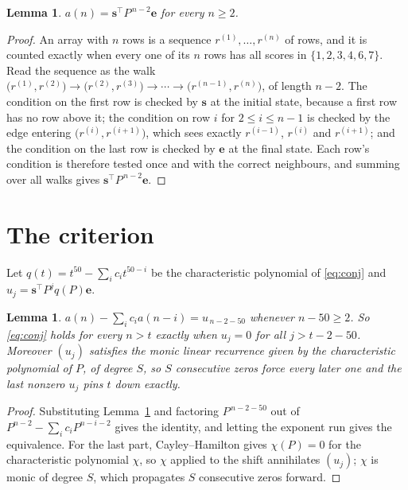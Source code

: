 \documentclass[11pt,a4paper]{article}
\theoremstyle{plain}
\newtheorem{lemma}[theorem]{Lemma}
\theoremstyle{definition}
\begin{document}
\begin{lemma}\label{lem:walk}
$a(n)=\mathbf{s}^{\!\top}P^{\,n-2}\mathbf{e}$ for every $n\ge2$.
\end{lemma}

\begin{proof}
An array with $n$ rows is a sequence $r^{(1)},\dots,r^{(n)}$ of rows, and it is counted
exactly when every one of its $n$ rows has all scores in $\{1,2,3,4,6,7\}$. Read the sequence as the
walk $\bigl(r^{(1)},r^{(2)}\bigr)\to\bigl(r^{(2)},r^{(3)}\bigr)\to\cdots\to
\bigl(r^{(n-1)},r^{(n)}\bigr)$, of length $n-2$. The condition on the first row is
checked by $\mathbf{s}$ at the initial state, because a first row has no row above it; the
condition on row $i$ for $2\le i\le n-1$ is checked by the edge entering
$\bigl(r^{(i)},r^{(i+1)}\bigr)$, which sees exactly $r^{(i-1)}$, $r^{(i)}$ and
$r^{(i+1)}$; and the condition on the last row is checked by $\mathbf{e}$ at the final
state. Each row's condition is therefore tested once and with the correct neighbours, and
summing over all walks gives $\mathbf{s}^{\!\top}P^{\,n-2}\mathbf{e}$.
\end{proof}

\section{The criterion}

Let $q(t)=t^{50}-\sum_i c_i t^{50-i}$ be the characteristic polynomial of
\eqref{eq:conj} and $u_j=\mathbf{s}^{\!\top}P^{j}q(P)\mathbf{e}$.

\begin{lemma}\label{lem:crit}
$a(n)-\sum_i c_i a(n-i)=u_{\,n-2-50}$ whenever $n-50\ge2$. So \eqref{eq:conj}
holds for every $n>t$ exactly when $u_j=0$ for all $j>t-2-50$. Moreover $(u_j)$
satisfies the monic linear recurrence given by the characteristic polynomial of $P$, of
degree $S$, so $S$ consecutive zeros force every later one and the last nonzero $u_j$ pins
$t$ down exactly.
\end{lemma}

\begin{proof}
Substituting Lemma~\ref{lem:walk} and factoring $P^{\,n-2-50}$ out of
$P^{n-2}-\sum_i c_i P^{n-i-2}$ gives the identity, and letting the exponent run gives the
equivalence. For the last part, Cayley--Hamilton gives $\chi(P)=0$ for the characteristic
polynomial $\chi$, so $\chi$ applied to the shift annihilates $(u_j)$; $\chi$ is monic of
degree $S$, which propagates $S$ consecutive zeros forward.
\end{proof}
\end{document}
